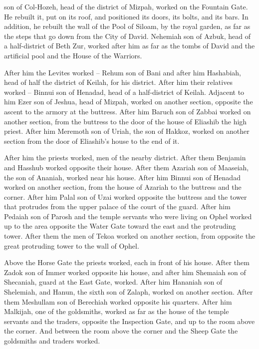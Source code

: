 {son
of Col-Hozeh,
head
of the district
of Mizpah,
worked
on the Fountain
Gate.
He
rebuilt
it, put on its roof,
and positioned
its doors,
its bolts,
and its bars.
In addition, he rebuilt the wall
of the Pool
of Siloam,
by the royal
garden,
as far as
the steps
that go down
from the City
of David.
Nehemiah
son
of Azbuk,
head
of a half-district
of Beth Zur,
worked
after
him as far as
the tombs
of David
and
the artificial pool
and
the House
of the Warriors.
\par }{\PP {}After
him the Levites
worked
– Rehum
son
of Bani
and after him Hashabiah,
head
of half
the district
of Keilah,
for his district.
After
him their relatives
worked
– Binnui
son
of Henadad,
head
of a half-district
of Keilah.
Adjacent
to
him Ezer
son
of Jeshua,
head
of Mizpah,
worked
on another
section,
opposite
the ascent
to the armory
at the buttress.
After
him Baruch
son
of Zabbai
worked
on another section,
from
the buttress
to
the door
of the house
of Eliashib
the high
priest.
After
him Meremoth
son
of Uriah,
the son
of Hakkoz,
worked on another
section
from the door
of Eliashib’s
house
to
the end of it.
\par }{\PP {}After
him the priests
worked,
men
of the nearby district.
After
them Benjamin
and Hasshub
worked
opposite
their house.
After
them Azariah
son
of Maaseiah,
the son
of Ananiah,
worked
near
his house.
After
him Binnui
son
of Henadad
worked
on
another
section,
from the house
of Azariah
to
the buttress
and the corner.
After him Palal
son
of Uzai
worked opposite
the buttress
and the tower
that protrudes
from the upper
palace
of the court
of the guard.
After
him Pedaiah
son
of Parosh
and the temple servants
who
were living
on Ophel
worked up to
the area
opposite
the Water
Gate
toward the east
and the protruding
tower.
After
them the men of Tekoa
worked
on another section,
from opposite
the great
protruding
tower
to
the wall
of Ophel.
\par }{\PP {}Above
the Horse
Gate
the priests
worked,
each
in front
of his house.
After
them Zadok
son
of Immer
worked
opposite
his house,
and after
him Shemaiah
son
of Shecaniah,
guard
at the East
Gate,
worked.
After
him Hananiah
son
of Shelemiah,
and Hanun,
the sixth
son
of Zalaph,
worked
on another section.
After
them Meshullam
son
of Berechiah
worked opposite
his quarters.
After
him Malkijah,
one of the goldsmiths,
worked
as far
as the house
of the temple servants
and the traders,
opposite
the Inspection
Gate,
and up to
the room
above the corner.
And between
the room
above the corner
and the Sheep
Gate
the goldsmiths
and traders
worked.

}
